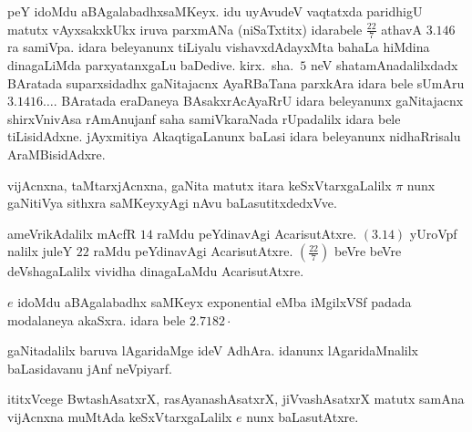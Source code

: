 peY idoMdu aBAgalabadhxsaMKeyx. idu uyAvudeV vaqtatxda paridhigU matutx vAyxsakxkUkx iruva parxmANa (niSaTxtitx) idarabele $\frac{22}{7}$ athavA $3.146$ ra samiVpa. idara beleyanunx tiLiyalu vishavxdAdayxMta bahaLa hiMdina dinagaLiMda parxyatanxgaLu baDedive. kirx.~sha.\ $5$ neV shatamAnadalilxdadx BAratada suparxsidadhx gaNitajacnx AyaRBaTana parxkAra idara bele sUmAru $3.1416\ldots$. BAratada eraDaneya BAsakxrAcAyaRrU idara beleyanunx gaNitajacnx shirxVnivAsa rAmAnujanf saha samiVkaraNada rUpadalilx idara bele tiLisidAdxne. jAyxmitiya AkaqtigaLanunx baLasi idara beleyanunx nidhaRrisalu AraMBisidAdxre. 

vijAcnxna, taMtarxjAcnxna, gaNita matutx itara keSxVtarxgaLalilx $\pi$ nunx gaNitiVya sithxra saMKeyx\-yAgi nAvu baLasutitxdedxVve. 

ameVrikAdalilx mAcfR $14$ raMdu peYdinavAgi AcarisutAtxre. $(3.14)$ yUroVpf nalilx juleY $22$ raMdu peYdinavAgi AcarisutAtxre. $(\frac{22}{7})$ beVre beVre deVshagaLalilx vividha dinagaLaMdu AcarisutAtxre.

$e$ idoMdu aBAgalabadhx saMKeyx {\rm exponential} eMba iMgilxVSf padada modala\-neya akaSxra. idara bele $2.7182\cdot$

gaNitadalilx baruva lAgaridaMge ideV AdhAra. idanunx lAgaridaMnalilx baLasidavanu jAnf neVpiyarf.

ititxVcege BwtashAsatxrX, rasAyanashAsatxrX, jiVvashAsatxrX matutx samAna vijAcnxna muMtAda keSxVtarxgaLalilx $e$ nunx baLasutAtxre.

